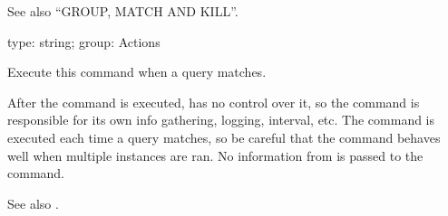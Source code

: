 \documentclass[letterpaper,10pt,english]{sphinxmanual}
\begin{document}
See also “GROUP, MATCH AND KILL”.

\begin{fulllineitems}
\label{\detokenize{mariadb-kill:cmdoption-mariadb-kill-execute-command}}
type: string; group: Actions

Execute this command when a query matches.

After the command is executed,  has no control over it, so the command
is responsible for its own info gathering, logging, interval, etc.  The
command is executed each time a query matches, so be careful that the command
behaves well when multiple instances are ran.  No information from  is
passed to the command.

See also {\hyperref[\detokenize{mariadb-kill:cmdoption-mariadb-kill-wait-before-kill}]{}}.

\end{fulllineitems}

\end{document}
